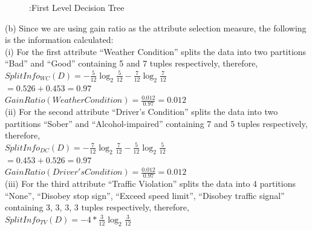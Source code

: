 \documentclass[10pt]{article}
\begin{document}
\begin{flushleft}
\begin{figure}[!htb]
\caption{:First Level Decision Tree}
\end{figure}
\vspace{1em}
(b) Since we are using gain ratio as the attribute selection measure, the following is the information calculated:\\
(i) For the first attribute ``Weather Condition'' splits the data into two partitions ``Bad'' and ``Good'' containing 5 and 7 tuples respectively, therefore, \\
\vspace{0.5em}
\hspace{2em} $SplitInfo_{WC}(D) = - \frac{5}{12} \log_2 \frac{5}{12} - \frac{7}{12} \log_2 \frac{7}{12}$\\
\vspace{0.5em}
\hspace{9.8em} $ = 0.526 + 0.453 = 0.97$\\
\vspace{0.5em}
\hspace{2em} $GainRatio(Weather Condition) = \frac{0.012}{0.97} = 0.012$\\
\vspace{1em}
(ii) For the second attribute ``Driver's Condition'' splits the data into two partitions ``Sober'' and ``Alcohol-impaired'' containing 7 and 5 tuples respectively, therefore, \\
\vspace{0.5em}
\hspace{2em} $SplitInfo_{DC}(D) = - \frac{7}{12} \log_2 \frac{7}{12} - \frac{5}{12} \log_2 \frac{5}{12}$\\
\vspace{0.5em}
\hspace{9.7em} $ = 0.453 + 0.526 = 0.97$\\
\vspace{0.5em}
\hspace{2em} $GainRatio(Driver's Condition) = \frac{0.012}{0.97} = 0.012$\\
\vspace{1em}
(iii) For the third attribute ``Traffic Violation'' splits the data into 4 partitions ``None'', ``Disobey stop sign'', ``Exceed speed limit'', ``Disobey traffic signal'' containing 3, 3, 3, 3 tuples respectively, therefore, \\
\vspace{0.5em}
\hspace{2em} $SplitInfo_{TV}(D) = - 4 * \frac{3}{12} \log_2 \frac{3}{12}$\\
\vspace{0.5em}

\end{flushleft}
\end{document}
